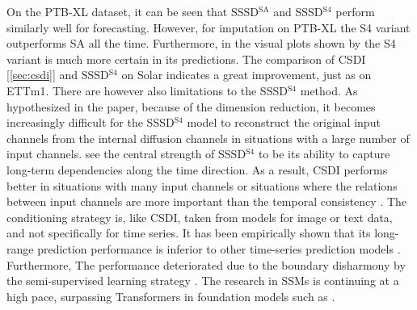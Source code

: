 On the PTB-XL dataset, it can be seen that SSSD$^{\text{SA}}$ and SSSD$^{\text{S4}}$ perform similarly well for forecasting. However, for imputation on PTB-XL the S4 variant outperforms SA all the time. Furthermore, in the visual plots shown by \cite{alcaraz_diffusion-based_2023} the S4 variant is much more certain in its predictions. The comparison of CSDI [\ref{sec:csdi}] and SSSD$^{\text{S4}}$ on Solar indicates a great improvement, just as on ETTm1.
There are however also limitations to the SSSD$^{\text{S4}}$ method. As hypothesized in the paper, because of the dimension reduction, it becomes increasingly difficult for the SSSD$^{\text{S4}}$ model to reconstruct the original input channels from the internal diffusion channels in situations with a large number of input channels. \textcite{alcaraz_diffusion-based_2023} see the central strength of SSSD$^{\text{S4}}$ to be its ability to capture long-term dependencies along the time direction. As a result, CSDI performs better in situations with many input channels or situations where the relations between input channels are more important than the temporal consistency \cite{alcaraz_diffusion-based_2023}.
The conditioning strategy is, like CSDI, taken from models for image or text data, and not specifically for time series. It has been empirically shown that its long-range prediction performance is inferior to other time-series prediction models \cite{shen_non-autoregressive_2023}. Furthermore, The performance deteriorated due to the boundary disharmony by the semi-supervised learning strategy \cite{shen_non-autoregressive_2023}.
The research in SSMs is continuing at a high pace, surpassing Transformers in foundation models such as \cite{gu_mamba_2023}.